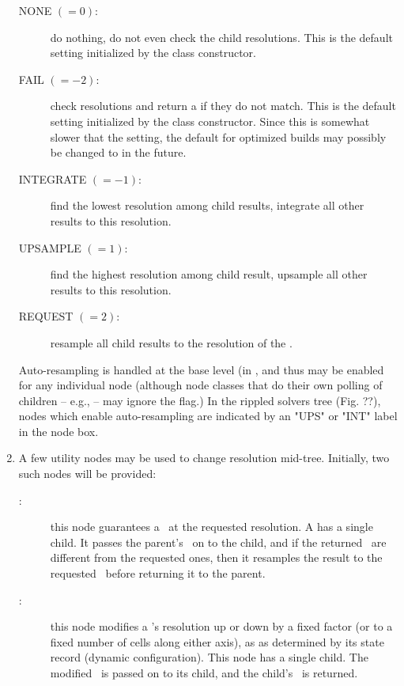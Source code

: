 \begin{enumerate}
\begin{description}
  \item[NONE $(=0)$:] do nothing, do not even check the child resolutions. This
  is the default setting initialized by the  class constructor.

  \item[FAIL $(=-2)$:] check resolutions and return a  if they do
  not match. This is the default setting initialized by the  class
  constructor. Since this is somewhat slower that the  setting, the
  default for optimized builds may possibly be changed to  in the
  future.

  \item[INTEGRATE $(=-1)$:] find the lowest resolution among child results,
  integrate all other results to this resolution.

  \item[UPSAMPLE $(=1)$:] find the highest resolution among child result,
  upsample all other results to this resolution.

  \item[REQUEST $(=2)$:] resample all child results to the resolution of the
  \Request.

  \end{description}
    
  Auto-resampling is handled at the base  level (in
  , and thus may be enabled for any individual node
  (although node classes that do their own polling of children -- e.g.,
   -- may ignore the flag.) In the rippled solvers tree (Fig. ??),
  nodes which enable auto-resampling are indicated by an "UPS" or "INT" label
  in the node box. 

  \item A few utility nodes may be used to change resolution mid-tree.
  Initially, two such nodes will be provided:

    \begin{description}
    
    \item[:] this node guarantees a \Result\ at the requested
    resolution. A  has a single child. It passes the parent's
    \Request\ on to the child, and if the returned \Cells\ are different from
    the requested ones, then it resamples the result to the requested \Cells\
    before returning it to the parent.

    \item[:] this node modifies a \Request's resolution up or down
    by a fixed factor (or to a fixed number of cells along either axis), as as
    determined by its state record (dynamic configuration). This node has a
    single child. The modified \Request\ is passed on to its child, and the
    child's \Result\ is returned.


\end{description}
\end{enumerate}
